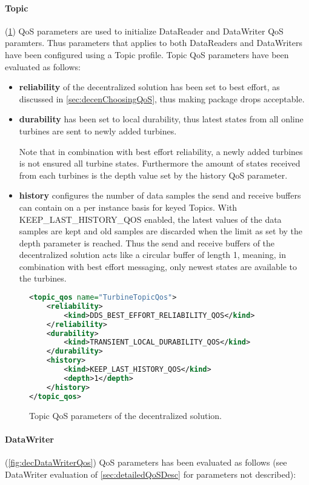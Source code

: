 \paragraph{Topic} (\cref{fig:decTopicQos}) QoS parameters are used to initialize DataReader and DataWriter QoS paramters. Thus parameters that applies to both DataReaders and DataWriters have been configured using a Topic profile. Topic QoS parameters have been evaluated as follows:

\begin{itemize}
	\item \textbf{reliability} of the decentralized solution has been set to best effort, as discussed in \cref{sec:decenChoosingQoS}, thus making package drops acceptable.
	\item \textbf{durability} has been set to local durability, thus latest states from all online turbines are sent to newly added turbines.
	
	Note that in combination with best effort reliability, a newly added turbines is not ensured all turbine states. Furthermore the amount of states received from each turbines is the depth value set by the history QoS parameter.
	\item \textbf{history} configures the number of data samples the send and receive buffers can contain on a per instance basis for keyed Topics. With KEEP\_LAST\_HISTORY\_QOS enabled, the latest values of the data samples are kept and old samples are discarded when the limit as set by the depth parameter is reached. Thus the send and receive buffers of the decentralized solution acts like a circular buffer of length 1, meaning, in combination with best effort messaging, only newest states are available to the turbines.
\end{itemize}

\begin{figure}[!h]
\begin{lstlisting}[language=XML]
<topic_qos name="TurbineTopicQos">
	<reliability>
		<kind>DDS_BEST_EFFORT_RELIABILITY_QOS</kind>
	</reliability>
	<durability>
		<kind>TRANSIENT_LOCAL_DURABILITY_QOS</kind>
	</durability>
	<history>
		<kind>KEEP_LAST_HISTORY_QOS</kind>
		<depth>1</depth>
	</history>
</topic_qos>
\end{lstlisting}
\caption[Decentralized Topic QoS parameters]{
		\label{fig:decTopicQos} 
		\footnotesize{Topic QoS parameters of the decentralized solution.}
	}
\end{figure}

\paragraph{DataWriter} (\cref{fig:decDataWriterQos}) QoS parameters has been evaluated as follows (see DataWriter evaluation of \cref{sec:detailedQoSDesc} for parameters not described):

